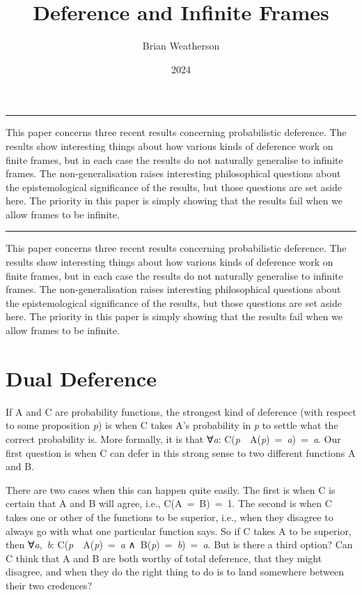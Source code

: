 \documentclass[
  10pt,
  letterpaper,
  DIV=11,
  numbers=noendperiod,
  twoside]{scrartcl}
\title{Deference and Infinite Frames}
\author{Brian Weatherson}
\date{2024}
\renewenvironment{abstract}
 {\vspace{-1.25cm}
 \quotation\small\noindent\rule{\linewidth}{.5pt}\par\smallskip
 \noindent }
 {\par\noindent\rule{\linewidth}{.5pt}\endquotation}
\begin{document}
\maketitle
\begin{abstract}
This paper concerns three recent results concerning probabilistic
deference. The results show interesting things about how various kinds
of deference work on finite frames, but in each case the results do not
naturally generalise to infinite frames. The non-generalisation raises
interesting philosophical questions about the epistemological
significance of the results, but those questions are set aside here. The
priority in this paper is simply showing that the results fail when we
allow frames to be infinite.
\end{abstract}

This paper concerns three recent results concerning probabilistic
deference. The results show interesting things about how various kinds
of deference work on finite frames, but in each case the results do not
naturally generalise to infinite frames. The non-generalisation raises
interesting philosophical questions about the epistemological
significance of the results, but those questions are set aside here. The
priority in this paper is simply showing that the results fail when we
allow frames to be infinite.

\section{Dual Deference}\label{sec-gallow}

If A and C are probability functions, the strongest kind of deference
(with respect to some proposition \emph{p}) is when C takes A's
probability in \emph{p} to settle what the correct probability is. More
formally, it is that ∀\emph{a}:
C(\emph{p}~\textbar~A(\emph{p})~=~\emph{a})~=~\emph{a}. Our first
question is when C can defer in this strong sense to two different
functions A and B.

There are two cases when this can happen quite easily. The first is when
C is certain that A and B will agree, i.e., C(A~=~B)~=~1. The second is
when C takes one or other of the functions to be superior, i.e., when
they disagree to always go with what one particular function says. So if
C takes A to be superior, then ∀\emph{a},~\emph{b}:
C(\emph{p}~\textbar~A(\emph{p})~=~\emph{a}
∧~B(\emph{p})~=~\emph{b})~=~\emph{a}. But is there a third option? Can C
think that A and B are both worthy of total deference, that they might
disagree, and when they do the right thing to do is to land somewhere
between their two credences?
\end{document}

